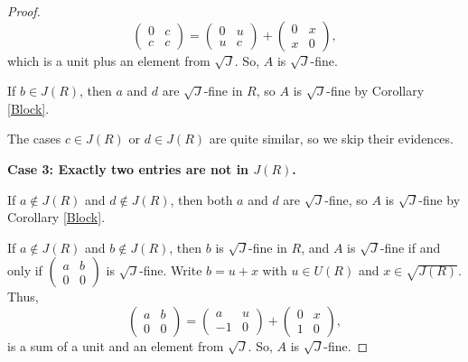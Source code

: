 \documentclass[10pt,a4paper]{amsart}
\begin{document}
\begin{proof}
	\[
	\begin{pmatrix} 0 & c \\ c & c \end{pmatrix}
	= \begin{pmatrix} 0 & u \\ u & c \end{pmatrix} + \begin{pmatrix} 0 & x \\ x & 0 \end{pmatrix},
	\]
which is a unit plus an element from $\sqrt{J}$. So, \( A \) is $\sqrt{J}$-fine.
	
If \( b \in J(R) \), then \( a \) and \( d \) are $\sqrt{J}$-fine in \( R \), so \( A \) is $\sqrt{J}$-fine by Corollary \ref{Block}.
	
The cases \( c \in J(R) \) or \( d \in J(R) \) are quite similar, so we skip their evidences.

\medskip
	
\textbf{Case 3: Exactly two entries are not in \( J(R) \).}

\medskip
	
If \( a \not\in J(R) \) and \( d \not\in J(R) \), then both \( a \) and \( d \) are $\sqrt{J}$-fine, so \( A \) is $\sqrt{J}$-fine by Corollary \ref{Block}.
	
If \( a \not\in J(R) \) and \( b \not\in J(R) \), then \( b \) is $\sqrt{J}$-fine in \( R \), and \( A \) is $\sqrt{J}$-fine if and only if \( \begin{pmatrix} a & b \\ 0 & 0 \end{pmatrix} \) is $\sqrt{J}$-fine. Write \( b = u + x \) with \( u \in U(R) \) and \( x \in \sqrt{J(R)} \). Thus,
	\[
	\begin{pmatrix} a & b \\ 0 & 0 \end{pmatrix}
	= \begin{pmatrix} a & u \\ -1 & 0 \end{pmatrix} + \begin{pmatrix} 0 & x \\ 1 & 0 \end{pmatrix},
	\]
is a sum of a unit and an element from $\sqrt{J}$. So, \( A \) is $\sqrt{J}$-fine.
	

\end{proof}
\end{document}
